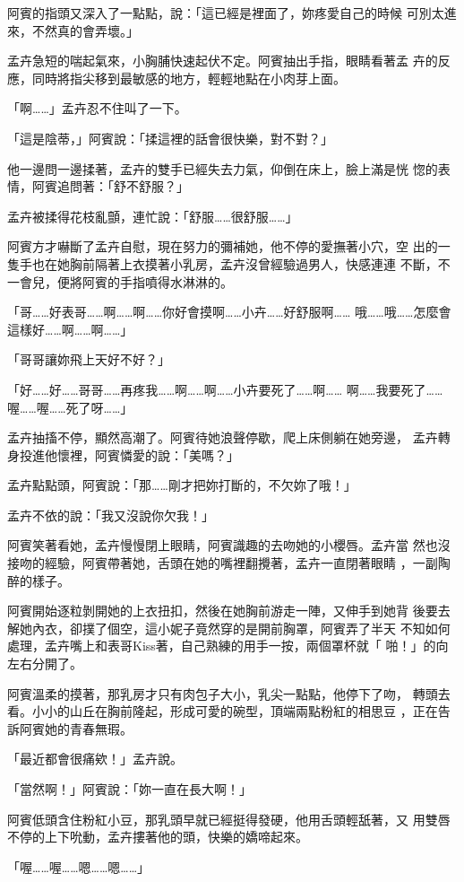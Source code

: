 阿賓的指頭又深入了一點點，說：「這已經是裡面了，妳疼愛自己的時候
可別太進來，不然真的會弄壞。」

孟卉急短的喘起氣來，小胸脯快速起伏不定。阿賓抽出手指，眼睛看著孟
卉的反應，同時將指尖移到最敏感的地方，輕輕地點在小肉芽上面。

「啊……」孟卉忍不住叫了一下。

「這是陰蒂，」阿賓說：「揉這裡的話會很快樂，對不對？」

他一邊問一邊揉著，孟卉的雙手已經失去力氣，仰倒在床上，臉上滿是恍
惚的表情，阿賓追問著：「舒不舒服？」

孟卉被揉得花枝亂顫，連忙說：「舒服……很舒服……」

阿賓方才嚇斷了孟卉自慰，現在努力的彌補她，他不停的愛撫著小穴，空
出的一隻手也在她胸前隔著上衣摸著小乳房，孟卉沒曾經驗過男人，快感連連
不斷，不一會兒，便將阿賓的手指噴得水淋淋的。

「哥……好表哥……啊……啊……你好會摸啊……小卉……好舒服啊……
哦……哦……怎麼會這樣好……啊……啊……」

「哥哥讓妳飛上天好不好？」

「好……好……哥哥……再疼我……啊……啊……小卉要死了……啊……
啊……我要死了……喔……喔……死了呀……」

孟卉抽搐不停，顯然高潮了。阿賓待她浪聲停歇，爬上床側躺在她旁邊，
孟卉轉身投進他懷裡，阿賓憐愛的說：「美嗎？」

孟卉點點頭，阿賓說：「那……剛才把妳打斷的，不欠妳了哦！」

孟卉不依的說：「我又沒說你欠我！」

阿賓笑著看她，孟卉慢慢閉上眼睛，阿賓識趣的去吻她的小櫻唇。孟卉當
然也沒接吻的經驗，阿賓帶著她，舌頭在她的嘴裡翻攪著，孟卉一直閉著眼睛
，一副陶醉的樣子。

阿賓開始逐粒剝開她的上衣扭扣，然後在她胸前游走一陣，又伸手到她背
後要去解她內衣，卻撲了個空，這小妮子竟然穿的是開前胸罩，阿賓弄了半天
不知如何處理，孟卉嘴上和表哥Kiss著，自己熟練的用手一按，兩個罩杯就「
啪！」的向左右分開了。

阿賓溫柔的摸著，那乳房才只有肉包子大小，乳尖一點點，他停下了吻，
轉頭去看。小小的山丘在胸前隆起，形成可愛的碗型，頂端兩點粉紅的相思豆
，正在告訴阿賓她的青春無瑕。

「最近都會很痛欸！」孟卉說。

「當然啊！」阿賓說：「妳一直在長大啊！」

阿賓低頭含住粉紅小豆，那乳頭早就已經挺得發硬，他用舌頭輕舐著，又
用雙唇不停的上下吮動，孟卉摟著他的頭，快樂的嬌啼起來。

「喔……喔……嗯……嗯……」

